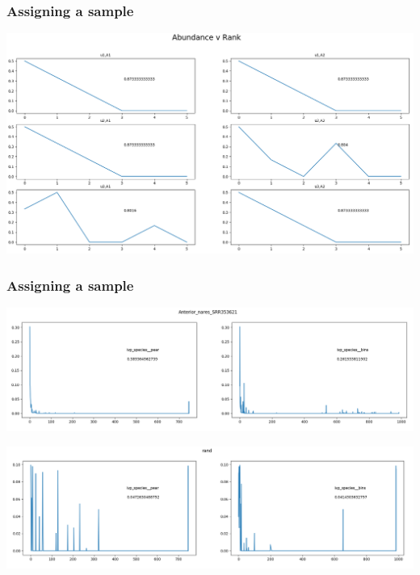 \documentclass{beamer}
\begin{document}
\begin{frame}
\frametitle{Assigning a sample}

	\begin{center}
		\includegraphics[scale = 0.3]{tiny.png}	
	\end{center}

\end{frame}
\begin{frame}
\frametitle{Assigning a sample}

	\begin{center}
		\includegraphics[scale = 0.25]{a_nares.png}	
	\end{center}

	\begin{center}
	\includegraphics[scale = 0.25]{random.png}	
\end{center}

\end{frame}
\end{document}
